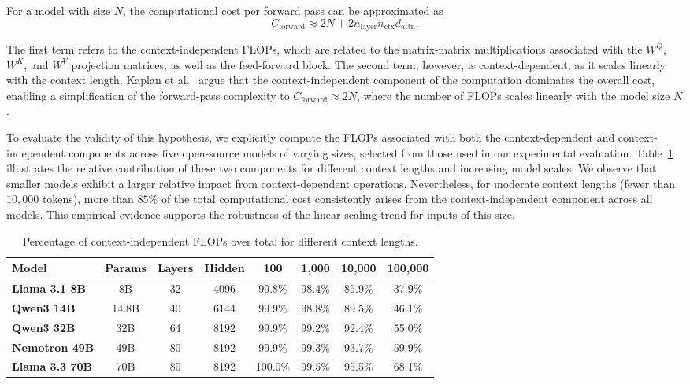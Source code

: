 For a model with size \( N \), the computational cost per forward pass can be approximated as
\[
C_{\text{forward}} \approx 2N + 2n_\text{layer} n_{\text{ctx}} d_{\text{attn}}.
\]

The first term refers to the context-independent FLOPs, which are related to the matrix-matrix multiplications associated with the $W^Q$, $W^K$, and $W^V$ projection matrices, as well as the feed-forward block. The second term, however, is context-dependent, as it scales linearly with the context length.
Kaplan et al.~\cite{kaplan2020scaling} argue that the context-independent component of the computation dominates the overall cost, enabling a simplification of the forward-pass complexity to $C_{\text{forward}} \approx 2N$, where the number of FLOPs scales linearly with the model size $N$.

To evaluate the validity of this hypothesis, we explicitly compute the FLOPs associated with both the context-dependent and context-independent components across five open-source models of varying sizes, selected from those used in our experimental evaluation. Table~\ref{tab:context_architecture} illustrates the relative contribution of these two components for different context lengths and increasing model scales. We observe that smaller models exhibit a larger relative impact from context-dependent operations. Nevertheless, for moderate context lengths (fewer than $10{,}000$ tokens), more than $85\%$ of the total computational cost consistently arises from the context-independent component across all models. This empirical evidence supports the robustness of the linear scaling trend for inputs of this size.

\begin{table}[h]
\centering
\caption{Percentage of context-independent FLOPs over total for different context lengths.}
\label{tab:context_architecture}
\begin{tabular}{lccccccc}
\toprule
\textbf{Model} & \textbf{Params} & \textbf{Layers} & \textbf{Hidden} &
\textbf{100} & \textbf{1,000} & \textbf{10,000} & \textbf{100,000} \\
\midrule
\textbf{Llama 3.1 8B}  & 8B      & 32 & 4096 & 99.8\% & 98.4\% & 85.9\% & 37.9\% \\
\textbf{Qwen3 14B}     & 14.8B   & 40 & 6144 & 99.9\% & 98.8\% & 89.5\% & 46.1\% \\
\textbf{Qwen3 32B}     & 32B     & 64 & 8192 & 99.9\% & 99.2\% & 92.4\% & 55.0\% \\
\textbf{Nemotron 49B}  & 49B     & 80 & 8192 & 99.9\% & 99.3\% & 93.7\% & 59.9\% \\
\textbf{Llama 3.3 70B} & 70B     & 80 & 8192 &100.0\% & 99.5\% & 95.5\% & 68.1\% \\
\bottomrule
\end{tabular}
\end{table}


